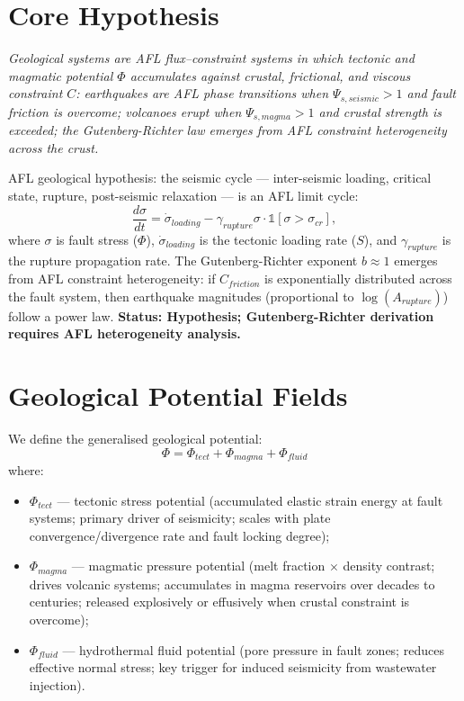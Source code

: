 \documentclass[11pt]{article}
\begin{document}
\section{Core Hypothesis}

\begin{center}
\textit{
Geological systems are AFL flux--constraint systems in which tectonic and magmatic potential
$\Phi$ accumulates against crustal, frictional, and viscous constraint $C$: earthquakes are AFL
phase transitions when $\Psi_{s,seismic} > 1$ and fault friction is overcome; volcanoes erupt when
$\Psi_{s,magma} > 1$ and crustal strength is exceeded; the Gutenberg-Richter law emerges from AFL
constraint heterogeneity across the crust.
}
\end{center}

AFL geological hypothesis: the seismic cycle --- inter-seismic loading, critical state, rupture,
post-seismic relaxation --- is an AFL limit cycle:
\begin{equation}
\frac{d\sigma}{dt} = \dot{\sigma}_{loading} - \gamma_{rupture} \sigma \cdot \mathbb{1}[\sigma > \sigma_{cr}],
\end{equation}
where $\sigma$ is fault stress ($\Phi$), $\dot{\sigma}_{loading}$ is the tectonic loading rate
($S$), and $\gamma_{rupture}$ is the rupture propagation rate. The Gutenberg-Richter exponent
$b \approx 1$ emerges from AFL constraint heterogeneity: if $C_{friction}$ is exponentially
distributed across the fault system, then earthquake magnitudes (proportional to $\log(A_{rupture})$)
follow a power law.
\textbf{Status: Hypothesis; Gutenberg-Richter derivation requires AFL heterogeneity analysis.}

\section{Geological Potential Fields}

We define the generalised geological potential:
\begin{equation}
\Phi = \Phi_{tect} + \Phi_{magma} + \Phi_{fluid}
\end{equation}
where:
\begin{itemize}
    \item $\Phi_{tect}$ --- tectonic stress potential (accumulated elastic strain energy at fault
          systems; primary driver of seismicity; scales with plate convergence/divergence rate and
          fault locking degree);
    \item $\Phi_{magma}$ --- magmatic pressure potential (melt fraction $\times$ density contrast;
          drives volcanic systems; accumulates in magma reservoirs over decades to centuries;
          released explosively or effusively when crustal constraint is overcome);
    \item $\Phi_{fluid}$ --- hydrothermal fluid potential (pore pressure in fault zones; reduces
          effective normal stress; key trigger for induced seismicity from wastewater injection).
\end{itemize}
\end{document}
